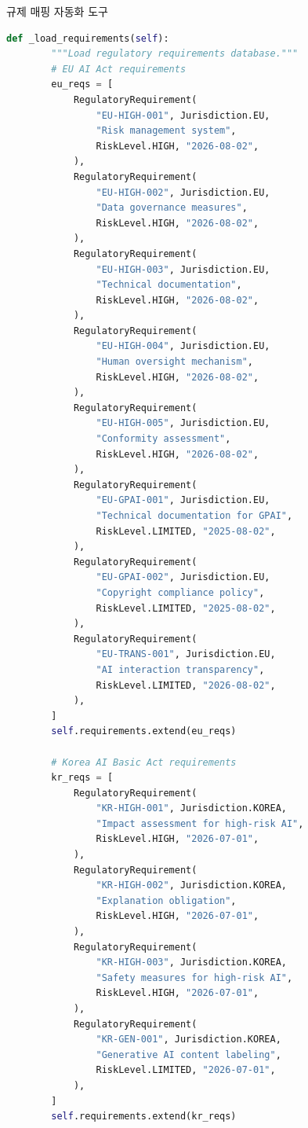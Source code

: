 \begin{practicaltool}{규제 매핑 자동화 도구}
\begin{lstlisting}[language=Python]
    def _load_requirements(self):
        """Load regulatory requirements database."""
        # EU AI Act requirements
        eu_reqs = [
            RegulatoryRequirement(
                "EU-HIGH-001", Jurisdiction.EU,
                "Risk management system",
                RiskLevel.HIGH, "2026-08-02",
            ),
            RegulatoryRequirement(
                "EU-HIGH-002", Jurisdiction.EU,
                "Data governance measures",
                RiskLevel.HIGH, "2026-08-02",
            ),
            RegulatoryRequirement(
                "EU-HIGH-003", Jurisdiction.EU,
                "Technical documentation",
                RiskLevel.HIGH, "2026-08-02",
            ),
            RegulatoryRequirement(
                "EU-HIGH-004", Jurisdiction.EU,
                "Human oversight mechanism",
                RiskLevel.HIGH, "2026-08-02",
            ),
            RegulatoryRequirement(
                "EU-HIGH-005", Jurisdiction.EU,
                "Conformity assessment",
                RiskLevel.HIGH, "2026-08-02",
            ),
            RegulatoryRequirement(
                "EU-GPAI-001", Jurisdiction.EU,
                "Technical documentation for GPAI",
                RiskLevel.LIMITED, "2025-08-02",
            ),
            RegulatoryRequirement(
                "EU-GPAI-002", Jurisdiction.EU,
                "Copyright compliance policy",
                RiskLevel.LIMITED, "2025-08-02",
            ),
            RegulatoryRequirement(
                "EU-TRANS-001", Jurisdiction.EU,
                "AI interaction transparency",
                RiskLevel.LIMITED, "2026-08-02",
            ),
        ]
        self.requirements.extend(eu_reqs)

        # Korea AI Basic Act requirements
        kr_reqs = [
            RegulatoryRequirement(
                "KR-HIGH-001", Jurisdiction.KOREA,
                "Impact assessment for high-risk AI",
                RiskLevel.HIGH, "2026-07-01",
            ),
            RegulatoryRequirement(
                "KR-HIGH-002", Jurisdiction.KOREA,
                "Explanation obligation",
                RiskLevel.HIGH, "2026-07-01",
            ),
            RegulatoryRequirement(
                "KR-HIGH-003", Jurisdiction.KOREA,
                "Safety measures for high-risk AI",
                RiskLevel.HIGH, "2026-07-01",
            ),
            RegulatoryRequirement(
                "KR-GEN-001", Jurisdiction.KOREA,
                "Generative AI content labeling",
                RiskLevel.LIMITED, "2026-07-01",
            ),
        ]
        self.requirements.extend(kr_reqs)


\end{lstlisting}
\end{practicaltool}
